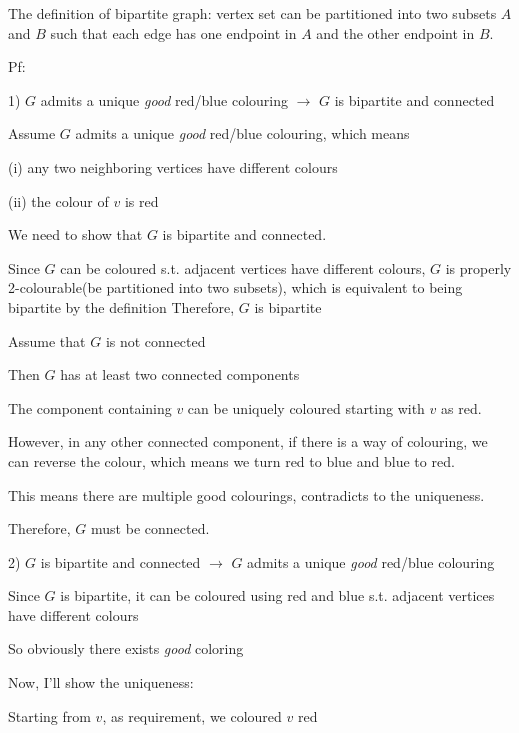 \documentclass[11pt,twoside]{article}
\begin{document}
The definition of bipartite graph: vertex set can be partitioned into two subsets $A$ and $B$ such that each edge has one endpoint in $A$ and the other endpoint in $B$.

Pf:

\hspace*{\fill}

1) 
$G$ admits a unique \textit{good} red/blue colouring $\rightarrow$ $G$ is bipartite and connected

Assume $G$ admits a unique \textit{good} red/blue colouring, which means 

    \qquad(i) any two neighboring vertices have different colours

    \qquad(ii) the colour of $v$ is red

We need to show that $G$ is bipartite and connected.

\hspace*{\fill}

Since $G$ can be coloured s.t. adjacent vertices have different colours, $G$ is properly 2-colourable(be partitioned into two subsets), which is equivalent to being bipartite by the definition
Therefore, $G$ is bipartite

Assume that $G$ is not connected

Then $G$ has at least two connected components

The component containing $v$ can be uniquely coloured starting with $v$ as red.

However, in any other connected component, if there is a way of colouring, we can reverse the colour, which means we turn red to blue and blue to red.


This means there are multiple good colourings, contradicts to the uniqueness.

Therefore, $G$ must be connected.

\hspace*{\fill}



2)
$G$ is bipartite and connected $\rightarrow$ $G$ admits a unique \textit{good} red/blue colouring

Since $G$ is bipartite, it can be coloured using red and blue s.t. adjacent vertices have different colours

So obviously there exists \textit{good} coloring

Now, I'll show the uniqueness:

Starting from $v$, as requirement, we coloured $v$ red
\end{document}
